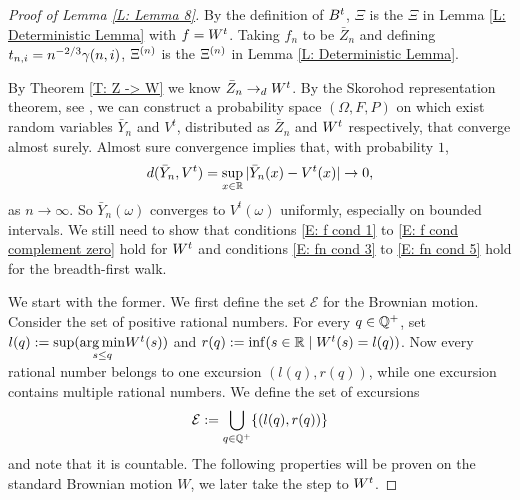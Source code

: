 \begin{proof}[Proof of Lemma \ref{L: Lemma 8}]
	By the definition of $B^t$, 
	$\Xi$ is the $\Xi$ in Lemma \ref{L: Deterministic Lemma} with $f = W^t$.
	Taking $f_n$ to be $\bar{Z}_n$ and defining $t_{n, i} = n^{-2 / 3} \gamma(n,i)$,
	$\Xi^{(n)}$ is the $\Xi^{(n)}$ in Lemma \ref{L: Deterministic Lemma}.
	
	By Theorem \ref{T: Z -> W} we know $\bar{Z}_n \rightarrow_d W^t$.
	By the Skorohod representation theorem,
	see \cite{Billingsley2009}, 
	we can construct a probability space 
	$(\Omega, F, P)$ 
	on which exist random variables
	$\bar{Y}_n$ and $V^t$,
	distributed as 
	$\bar{Z}_n$ and $W^t$ respectively,
	that converge almost surely.
	Almost sure convergence implies that,
	with probability $1$,
	\begin{equation}
	d(\bar{Y}_n, V^t) = \sup_{x \in \mathbb{R}}|\bar{Y}_n(x) - V^t(x)| \rightarrow 0,
	\end{equation}
	as $n \rightarrow \infty$.
	So $\bar{Y}_n(\omega)$ converges to $V^t(\omega)$ uniformly,
	especially on bounded intervals.
	We still need to show that conditions \eqref{E: f cond 1} to \eqref{E: f cond complement zero} hold for $W^t$
	and conditions \eqref{E: fn cond 3} to \eqref{E: fn cond 5} hold for the breadth-first walk.
	
	
	We start with the former. 
	We first define the set $\mathcal{E}$ for the Brownian motion.
	Consider the set of positive rational numbers.
	For every $q \in \mathbb{Q}^+$, 
	set $l(q) := \sup( \underset{s \leq q}{\operatorname*{arg\,min}} W^t(s) ) $ 
	and $r(q) := \inf( {s \in \mathbb{R} \; | \; W^t(s) = l(q)} ) $.
	Now every rational number belongs to one excursion $(l(q), r(q))$,
	while one excursion contains multiple rational numbers.
	We define the set of excursions
	\begin{equation}
	\mathcal{E} := \bigcup_{q \in \mathbb{Q}^+} \{ (l(q), r(q)) \}
	\end{equation}
	and note that it is countable.
	The following properties will be proven on the standard Brownian motion $W$,
	we later take the step to $W^t$.
	

\end{proof}
